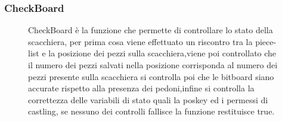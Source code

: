 \FloatBarrier

\subsubsection{CheckBoard}
\FloatBarrier

\begin{figure}[H]
    \begin{minipage}[t]{.63\textwidth}
        \centering {}
    \end{minipage}
    \begin{minipage}[t]{0.35\textwidth}
        \large{CheckBoard è la funzione che permette di controllare lo stato della scacchiera, per prima cosa viene effettuato un riscontro tra la piece-list e la posizione dei pezzi sulla scacchiera,viene poi controllato che il numero dei pezzi salvati nella posizione corrisponda al numero dei pezzi presente sulla scacchiera
            si controlla poi che le bitboard siano accurate rispetto alla presenza dei pedoni,infine si controlla la correttezza delle variabili di stato quali la poskey ed i permessi di castling, se nessuno dei controlli fallisce la funzione restituisce true.}
    \end{minipage}
\end{figure}

\FloatBarrier






